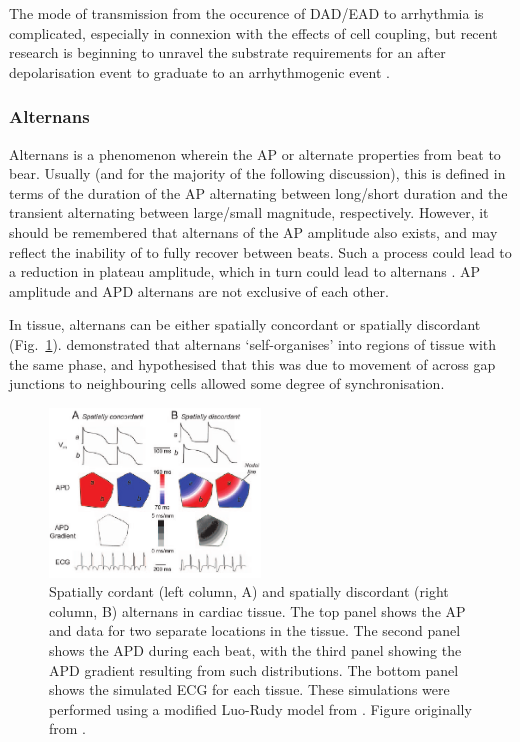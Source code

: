 \documentclass[../thesis-main.tex]{subfiles}
\begin{document}
The mode of transmission from the occurence of DAD/EAD to arrhythmia is complicated, especially in connexion with the effects of cell coupling, but recent research is beginning to unravel the substrate requirements for an after depolarisation event to graduate to an arrhythmogenic event \citep{Tanskanen2005}.

\subsubsection{Alternans}
\label{subsubsec:alternans}
Alternans is a phenomenon wherein the AP or \cai{} alternate properties from beat to bear. Usually (and for the majority of the following discussion), this is defined in terms of the duration of the AP alternating between long/short duration and the  \cai{} transient alternating between large/small magnitude, respectively. However, it should be remembered that alternans of the AP amplitude also exists, and may reflect the inability of \ina{} to fully recover between beats. Such a process could lead to a reduction in plateau amplitude, which in turn could lead to \cai{} alternans \citep{Clusin2003}. AP amplitude and APD alternans are not exclusive of each other.

In tissue, alternans can be either spatially concordant or spatially discordant (Fig.~\ref{fig:alternans}). \citet{Qian2001} demonstrated that \ca{} alternans `self-organises' into regions of tissue with the same phase, and hypothesised that this was due to movement of \ca{} across gap junctions to neighbouring cells allowed some degree of synchronisation.
\begin{figure}
 \centering
 \includegraphics[width=0.5\textwidth]{alternans}
 \caption[Spatially cordant and spatially discordant alternans in cardiac tissue]{Spatially cordant (left column, A) and spatially discordant (right column, B) alternans in cardiac tissue. The top panel shows the AP and \cai{} data for two separate locations in the tissue. The second panel shows the APD during each beat, with the third panel showing the APD gradient resulting from such distributions. The bottom panel shows the simulated ECG for each tissue. These simulations were performed using a modified Luo-Rudy model from \citet{Qu2000}. Figure originally from \citet{Weiss2006}.}
 \label{fig:alternans}
\end{figure}
\end{document}
